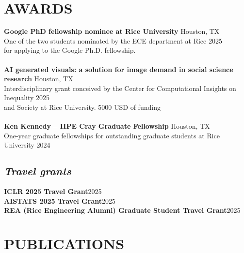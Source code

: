 \documentclass[a4paper,9pt]{extarticle}
\begin{document}
\section*{AWARDS}
\textbf{Google PhD fellowship nominee at Rice University}  \hfill Houston, TX\\
One of the two students nominated by the ECE department at Rice \hfill 2025\\
for applying to the Google Ph.D. fellowship.\\ \\
\textbf{AI generated visuals: a solution for image demand in social science research}  \hfill Houston, TX\\
Interdisciplinary grant conceived by the Center for Computational Insights on Inequality \hfill 2025\\
and Society at Rice University. 5000 USD of funding\\ \\
\textbf{Ken Kennedy – HPE Cray Graduate Fellowship}  \hfill Houston, TX\\
One-year graduate fellowships for outstanding graduate students at Rice University \hfill 2024\\

\subsection*{\textit{Travel grants}}
\textbf{ICLR 2025 Travel Grant}\hfill 2025\\
\textbf{AISTATS 2025 Travel Grant}\hfill 2025\\
\textbf{REA (Rice Engineering Alumni) Graduate Student Travel Grant}\hfill 2025\\

\section*{PUBLICATIONS}
\end{document}
